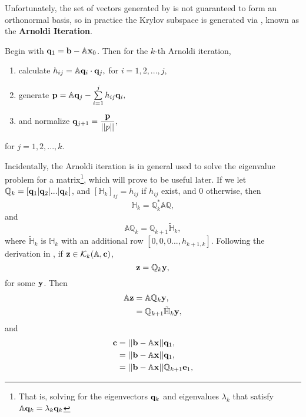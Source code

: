 Unfortunately, the set of vectors generated by  is not guaranteed to form an orthonormal basis, so in practice the Krylov subspace is generated via , known as the {\bf Arnoldi Iteration}. 
\begin{algorithm}\label{alg:Arnoldi}
Begin with $\mathbf{q}_1 = \mathbf{b} - \mathbb{A}\mathbf{x}_0$. Then for the $k$-th Arnoldi iteration,
\begin{enumerate}
\item calculate $h_{ij} = \mathbb{A}\mathbf{q}_{i} \cdot \mathbf{q}_j,$ for $i = 1,2,...,j$,
\item generate $\Vector{p} = \mathbb{A}\Vector{q}_j - \sum{i=1}{j}{h_{ij}\Vector{q}_i},$ 
\item and normalize $\mathbf{q}_{j+1} = \dfrac{\mathbf{p}}{||p||},$
\end{enumerate}
for $j = 1,2,...,k$.
\end{algorithm}
Incidentally, the Arnoldi iteration is in general used to solve the eigenvalue problem for a matrix\footnote{That is, solving for the eigenvectors $\mathbf{q}_k$ and eigenvalues $\lambda_k$ that satisfy $\mathbb{A}\mathbf{q}_k = \lambda_k\mathbf{q}_k$}, which will prove to be useful later. If we let $\mathbb{Q}_k = [ \mathbf{q}_1| \mathbf{q}_2 | ... |\mathbf{q}_k ]$, and $[\mathbb{H}_k]_{ij} = h_{ij}$ if $h_{ij}$ exist, and $0$ otherwise, then 
\begin{equation}
\mathbb{H}_k = \mathbb{Q}_k^* \mathbb{A}\mathbb{Q},
\end{equation}
and 
\begin{equation}\label{eq:Qiter}
\mathbb{A}\mathbb{Q}_k = \mathbb{Q}_{k+1}\mathbb{\tilde{H}}_k,
\end{equation}
where $\mathbb{\tilde{H}}_k$ is $\mathbb{H}_k$ with an additional row $[0,0,0...,h_{k+1,k}]$. Following the derivation in , if $\mathbf{z} \in \mathcal{K}_k(\mathbb{A},\mathbf{c})$, 
\begin{equation}
\mathbf{z} = \mathbb{Q}_k \mathbf{y},
\end{equation}
for some $\mathbf{y}$. Then 
\begin{align}
\begin{split}
\mathbb{A}\mathbf{z} &= \mathbb{A}\mathbb{Q}_{k}\mathbf{y},\\
				&= \mathbb{Q}_{k+1}\mathbb{\tilde{H}}_{k}\mathbf{y},
\end{split}
\end{align}
and
\begin{align} 
\begin{split}
\mathbf{c} &= ||\mathbf{b} - \mathbb{A}\mathbf{x}||\mathbf{q}_1, \\
	&= ||\mathbf{b} - \mathbb{A}\mathbf{x}||\mathbf{q}_1,\\
	&= ||\mathbf{b} - \mathbb{A}\mathbf{x}||\mathbb{Q}_{k+1}\mathbf{e}_1,
\end{split}
\end{align}
